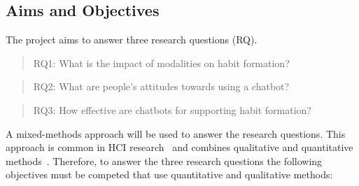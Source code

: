\newpage

\subsection{Aims and Objectives}
The project aims to answer three research questions (RQ).

\begin{quote}
RQ1: What is the impact of modalities on habit formation?
\end{quote}
\begin{quote}
RQ2: What are people's attitudes towards using a chatbot?
\end{quote}
\begin{quote}
RQ3: How effective are chatbots for supporting habit formation?
\end{quote}

A mixed-methods approach will be used to answer the research questions. This approach is common in HCI research~\cite{hci_mixed_methods} and combines qualitative and quantitative methods~\cite{hci_mixed_methods_2}. Therefore, to answer the three research questions the following objectives must be competed that use quantitative and qualitative methods:

